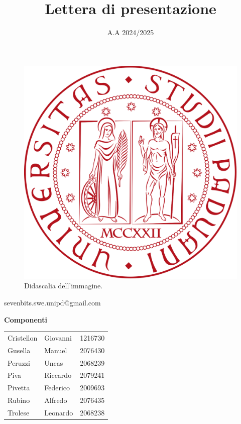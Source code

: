 \documentclass[10pt]{article}
\title{Lettera di presentazione}
\date{A.A 2024/2025}
\begin{document}
\maketitle
\begin{center}
\begin{figure}[htbp] %
    \centering
    \includegraphics[width=\textwidth]{images/LogoUnipd.png}
    \caption{Didascalia dell'immagine.}
\end{figure}

sevenbits.swe.unipd@gmail.com\\
\vspace{2cm}

\textbf{Componenti}\\
\vspace{2mm}
\begin{tabular}{l l l}
Cristellon & Giovanni & 1216730\\
Gusella & Manuel & 2076430\\
Peruzzi & Uncas & 2068239\\
Piva & Riccardo & 2079241\\
Pivetta & Federico & 2009693\\
Rubino & Alfredo & 2076435\\
Trolese & Leonardo & 2068238\\ 
\end{tabular}
\end{center}
\end{document}
